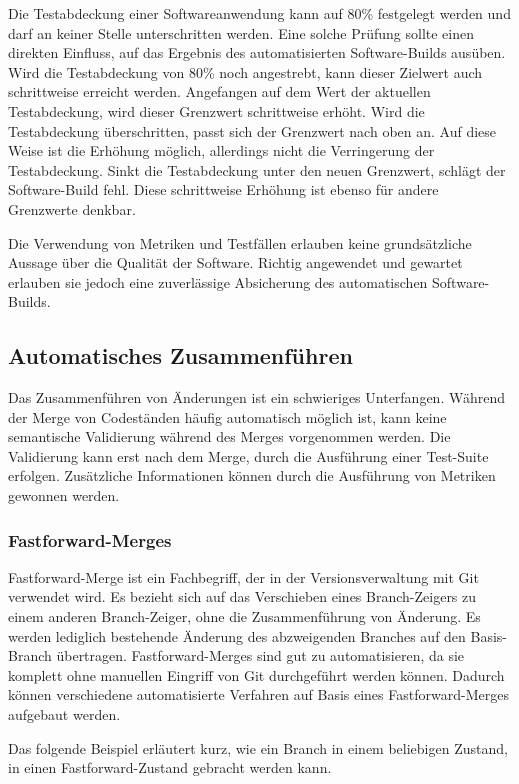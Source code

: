Die Testabdeckung einer Softwareanwendung kann auf 80\% festgelegt werden und darf an keiner Stelle unterschritten werden. Eine solche Prüfung sollte einen direkten Einfluss, auf das Ergebnis des automatisierten Software-Builds ausüben. Wird die Testabdeckung von 80\% noch angestrebt, kann dieser Zielwert auch schrittweise erreicht werden. Angefangen auf dem Wert der aktuellen Testabdeckung, wird dieser Grenzwert schrittweise erhöht. Wird die Testabdeckung überschritten, passt sich der Grenzwert nach oben an. Auf diese Weise ist die Erhöhung möglich, allerdings nicht die Verringerung der Testabdeckung. Sinkt die Testabdeckung unter den neuen Grenzwert, schlägt der Software-Build fehl. Diese schrittweise Erhöhung ist ebenso für andere Grenzwerte denkbar.

Die Verwendung von Metriken und Testfällen erlauben keine grundsätzliche Aussage über die Qualität der Software. Richtig angewendet und gewartet erlauben sie jedoch eine zuverlässige Absicherung des automatischen Software-Builds.

\subsection{Automatisches Zusammenführen}

Das Zusammenführen von Änderungen ist ein schwieriges Unterfangen. Während der Merge von Codeständen häufig automatisch möglich ist, kann keine semantische Validierung während des Merges vorgenommen werden. Die Validierung kann erst nach dem Merge, durch die Ausführung einer Test-Suite erfolgen. Zusätzliche Informationen können durch die Ausführung von Metriken gewonnen werden.

\subsubsection{Fastforward-Merges}

Fastforward-Merge ist ein Fachbegriff, der in der Versionsverwaltung mit Git verwendet wird. Es bezieht sich auf das Verschieben eines Branch-Zeigers zu einem anderen Branch-Zeiger, ohne die Zusammenführung von Änderung. Es werden lediglich bestehende Änderung des abzweigenden Branches auf den Basis-Branch übertragen.
Fastforward-Merges sind gut zu automatisieren, da sie komplett ohne manuellen Eingriff von Git durchgeführt werden können. Dadurch können verschiedene automatisierte Verfahren auf Basis eines Fastforward-Merges aufgebaut werden.

Das folgende Beispiel erläutert kurz, wie ein Branch in einem beliebigen Zustand, in einen Fastforward-Zustand gebracht werden kann.

